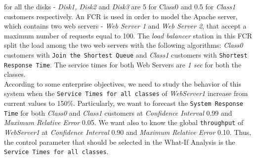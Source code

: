 for all the disks - \emph{Disk1, Disk2} and \emph{Disk3} are 5 for
Class0 and 0.5 for \emph{Class1} customers respectively. An FCR is
used in order to model the Apache server, which contains two web
servers - \emph{Web Server 1} and \emph{Web Server 2}, that accept
a maximum number of requests equal to 100. The \emph{load
balancer} station in this FCR split the load among the two web
servers with the following algorithms: \emph{Class0} customers
with \texttt{Join the Shortest Queue} and \emph{Class1} customers
with \texttt{Shortest Response Time}. The service times for both
Web Servers are \emph{1 sec} for both the
classes.\\
According to some enterprise  objectives, we need to study the
behavior of this system when the \texttt{Service Times for all
classes} of \emph{WebServer1} increase from current values to
150\%. Particularly, we want to forecast the \texttt{System
Response Time} for both \emph{Class0} and \emph{Class1} customers
at \emph{Confidence Interval} 0.99 and \emph{Maximum Relative
Error} 0.05. We want also to know the global \texttt{throughput}
of \emph{WebServer1} at \emph{Confidence Interval} 0.90 and
\emph{Maximum Relative Error} 0.10. Thus, the control parameter
that should be selected in the What-If Analysis is the
\texttt{Service Times for all classes}.\\

